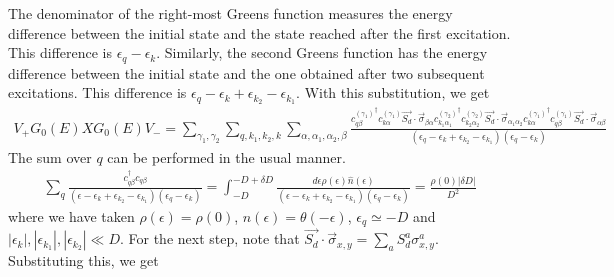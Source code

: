 \documentclass[twoside,11pt]{report}
\numberwithin{equation}{section}
\begin{document}
The denominator of the right-most Greens function measures the energy difference between the initial state and the state reached after the first excitation. This difference is \(\epsilon_q - \epsilon_k\). Similarly, the second Greens function has the energy difference between the initial state and the one obtained after two subsequent excitations. This difference is \(\epsilon_q - \epsilon_k + \epsilon_{k_2} - \epsilon_{k_1}\). With this substitution, we get 
\begin{equation}\begin{aligned}
	V_+G_0(E)XG_0(E)V_- = \sum_{\gamma_1,\gamma_2}\sum_{q,k_1,k_2,k}\sum_{\alpha,\alpha_1,\alpha_2,\beta}\frac{{c^{(\gamma_1)}_{q\beta}}^\dagger {c^{(\gamma_1)}_{k\alpha}}\vec{S_d}\cdot\vec{\sigma}_{\beta \alpha} {c^{(\gamma_2)}_{k_1 \alpha_1}}^\dagger{c^{(\gamma_2)}_{k_2 \alpha_2}}\vec{S_d}\cdot\vec{\sigma}_{\alpha_1 \alpha_2} {c^{(\gamma_1)}_{k\alpha}}^\dagger {c^{(\gamma_1)}_{q\beta}}\vec{S_d}\cdot\vec{\sigma}_{\alpha \beta}}{\left(\epsilon_q - \epsilon_k + \epsilon_{k_2} - \epsilon_{k_1}\right)\left(\epsilon_q - \epsilon_k\right)}
\end{aligned}\end{equation}
The sum over \(q\) can be performed in the usual manner.
\begin{equation}\begin{aligned}
	\sum_q \frac{c^\dagger_{q\beta}c_{q\beta}}{\left(\epsilon - \epsilon_k + \epsilon_{k_2} - \epsilon_{k_1}\right)\left(\epsilon_q - \epsilon_k\right)} = \int_{-D}^{-D + \delta D} \frac{d\epsilon \rho(\epsilon)\hat n(\epsilon)}{\left(\epsilon - \epsilon_k + \epsilon_{k_2} - \epsilon_{k_1}\right)\left(\epsilon_q - \epsilon_k\right) } = \frac{\rho(0) |\delta D|}{D^2}
\end{aligned}\end{equation}
where we have taken \(\rho(\epsilon) = \rho(0)\), \(\hat n(\epsilon) = \theta(-\epsilon)\), \(\epsilon_q \simeq -D\) and \(|\epsilon_{k}|,|\epsilon_{k_1}|, |\epsilon_{k_2}| \ll D\). 
For the next step, note that \(\vec{S_d}\cdot\vec{\sigma}_{x,y} = \sum_{a}S_d^a \sigma^a_{x,y}\). Substituting this, we get
\end{document}

